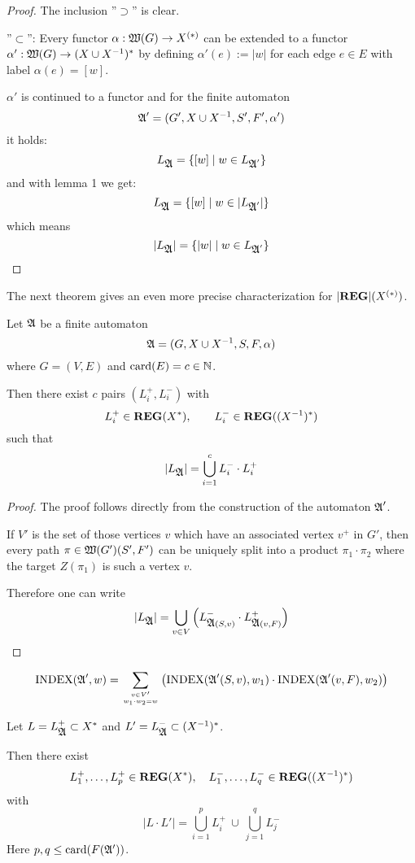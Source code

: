 \begin{proof}
 The inclusion ''$\supset$'' is clear.
 
 ''$\subset$'': Every functor $\alpha : \mbox{$\mathfrak{W}(G)$} \to \mbox{${X}^{(*)}$}$ can be
 extended to a functor $\alpha' : \mbox{$\mathfrak{W}(G)$} \to (X \cup {X}^{-1})^*$ by
 defining $\alpha'(e) := |w|$ for each edge $e \in E$ with label $\alpha(e) =
 [w]$.
 
 $\alpha'$ is continued to a functor and for the finite automaton
 \[ \mbox{$\mathfrak{A}$}' = (G', X \cup {X}^{-1}, S', F', \alpha') \]
 it holds:
 \[ L_{\mbox{$\mathfrak{A}$}} = \mbox{$\{[w] \mid w \in L_{\mbox{$\mathfrak{A}$}'}\}$} \]
 and with lemma 1 we get:
 \[ L_{\mbox{$\mathfrak{A}$}} = \mbox{$\{[w] \mid w \in |L_{\mbox{$\mathfrak{A}$}'}|\}$} \]
 which means
 \[ |L_{\mbox{$\mathfrak{A}$}}| = \mbox{$\{|w| \mid w \in L_{\mbox{$\mathfrak{A}$}'}\}$} \]
\end{proof}

The next theorem gives an even more precise characterization for
$|\mbox{{\bf REG}}|(\mbox{${X}^{(*)}$})$.

\begin{theorem}
Let $\mbox{$\mathfrak{A}$}$ be a finite automaton
\[ \mbox{$\mathfrak{A}$} = (G, X \cup {X}^{-1}, S, F, \alpha) \]
where $G = (V, E)$ and $\mathrm{card}(E) = c \in \mathbb{N}$.

Then there exist $c$ pairs $(L_i^+, L_i^-)$ with 
\[ L_i^+ \in \mbox{{\bf REG}}(X^*),\qquad L_i^- \in \mbox{{\bf REG}}((X^{-1})^*) \]
such that
\[ |L_{\mbox{$\mathfrak{A}$}}| = \bigcup_{i=1}^c L_i^- \cdot L_i^+ \]
\end{theorem}

\begin{proof}
The proof follows directly from the construction of the automaton $\mbox{$\mathfrak{A}$}'$.

If $V'$ is the set of those vertices $v$ which have an associated vertex $v^+$
in $G'$, then every path $\pi \in \mbox{$\mathfrak{W}(G')$}(S', F')$ can be uniquely split into
 a product $\pi_1 \cdot \pi_2$ where the target $Z(\pi_1)$ is such a vertex $v$.

Therefore one can write
\[ |L_{\mbox{$\mathfrak{A}$}}| = \bigcup_{v \in V} \left( L_{\mbox{$\mathfrak{A}$}(S, v)}^- 
\cdot L_{\mbox{$\mathfrak{A}$}(v, F)}^+ \right)
\]
\end{proof}

\begin{corollary}
\[ \mathrm{INDEX}(\mbox{$\mathfrak{A}$}', w) = \sum_{v \in V' \atop w_1 \cdot w_2 = w} \left(
\mathrm{INDEX}(\mbox{$\mathfrak{A}$}'(S, v), w_1) \cdot \mathrm{INDEX}(\mbox{$\mathfrak{A}$}'(v, F), w_2)
\right) \]
\end{corollary}

\bigskip
\begin{lemma}
Let $L = L_{\mbox{$\mathfrak{A}$}}^+ \subset X^*$ and $L' = L_{\mbox{$\mathfrak{A}$}}^- \subset (X^{-1})^*$.

Then there exist 
\[ L_1^+, \ldots, L_p^+ \in \mbox{{\bf REG}}(X^*),\quad L_1^-, \ldots, L_q^- \in
\mbox{{\bf REG}}((X^{-1})^*) \]
with
\[ |L \cdot L'| = \bigcup_{i=1}^{p} L_i^+ \ \cup\ \bigcup_{j=1}^{q} L_j^- \]
Here $p, q \leq \mathrm{card}(F(\mbox{$\mathfrak{A'}$}))$.
\end{lemma}

